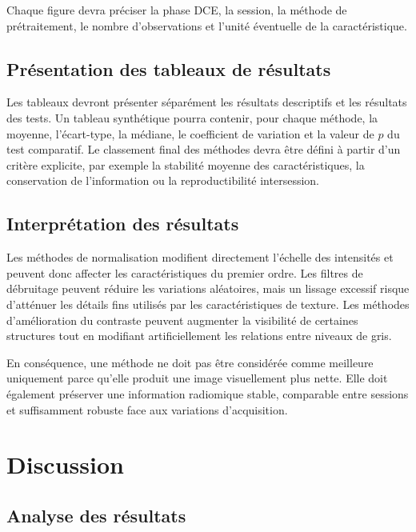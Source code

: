Chaque figure devra préciser la phase DCE, la session, la méthode de prétraitement, le nombre d'observations et l'unité éventuelle de la caractéristique.

\subsection{Présentation des tableaux de résultats}
\label{subsec:tableaux_resultats}

Les tableaux devront présenter séparément les résultats descriptifs et les résultats des tests. Un tableau synthétique pourra contenir, pour chaque méthode, la moyenne, l'écart-type, la médiane, le coefficient de variation et la valeur de $p$ du test comparatif. Le classement final des méthodes devra être défini à partir d'un critère explicite, par exemple la stabilité moyenne des caractéristiques, la conservation de l'information ou la reproductibilité intersession.

\subsection{Interprétation des résultats}
\label{subsec:interpretation_resultats}

Les méthodes de normalisation modifient directement l'échelle des intensités et peuvent donc affecter les caractéristiques du premier ordre. Les filtres de débruitage peuvent réduire les variations aléatoires, mais un lissage excessif risque d'atténuer les détails fins utilisés par les caractéristiques de texture. Les méthodes d'amélioration du contraste peuvent augmenter la visibilité de certaines structures tout en modifiant artificiellement les relations entre niveaux de gris.

En conséquence, une méthode ne doit pas être considérée comme meilleure uniquement parce qu'elle produit une image visuellement plus nette. Elle doit également préserver une information radiomique stable, comparable entre sessions et suffisamment robuste face aux variations d'acquisition.

\section{Discussion}
\label{sec:discussion}

\subsection{Analyse des résultats}
\label{subsec:discussion_analyse}

